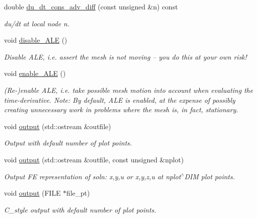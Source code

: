 \begin{DoxyCompactItemize}
double \hyperlink{classoomph_1_1GeneralisedAdvectionDiffusionEquations_a7341d08424050525cfe3430001c1dced}{du\+\_\+dt\+\_\+cons\+\_\+adv\+\_\+diff} (const unsigned \&n) const
\begin{DoxyCompactList}\small\item\em du/dt at local node n. \end{DoxyCompactList}\item 
void \hyperlink{classoomph_1_1GeneralisedAdvectionDiffusionEquations_a25fde0b26b7d44ef2edff08e0d124037}{disable\+\_\+\+A\+LE} ()
\begin{DoxyCompactList}\small\item\em Disable A\+LE, i.\+e. assert the mesh is not moving -- you do this at your own risk! \end{DoxyCompactList}\item 
void \hyperlink{classoomph_1_1GeneralisedAdvectionDiffusionEquations_ad9a64a539984e8f0a1d3ab0b5c0d84c9}{enable\+\_\+\+A\+LE} ()
\begin{DoxyCompactList}\small\item\em (Re-\/)enable A\+LE, i.\+e. take possible mesh motion into account when evaluating the time-\/derivative. Note\+: By default, A\+LE is enabled, at the expense of possibly creating unnecessary work in problems where the mesh is, in fact, stationary. \end{DoxyCompactList}\item 
void \hyperlink{classoomph_1_1GeneralisedAdvectionDiffusionEquations_a6a225f0d19451429969ba92705bce96e}{output} (std\+::ostream \&outfile)
\begin{DoxyCompactList}\small\item\em Output with default number of plot points. \end{DoxyCompactList}\item 
void \hyperlink{classoomph_1_1GeneralisedAdvectionDiffusionEquations_a44995055f98a97ce229609832a03867e}{output} (std\+::ostream \&outfile, const unsigned \&nplot)
\begin{DoxyCompactList}\small\item\em Output FE representation of soln\+: x,y,u or x,y,z,u at nplot$^\wedge$\+D\+IM plot points. \end{DoxyCompactList}\item 
void \hyperlink{classoomph_1_1GeneralisedAdvectionDiffusionEquations_a299369dd1b578aa3634623c636440dde}{output} (F\+I\+LE $\ast$file\+\_\+pt)
\begin{DoxyCompactList}\small\item\em C\+\_\+style output with default number of plot points. \end{DoxyCompactList}\item 

\end{DoxyCompactItemize}
